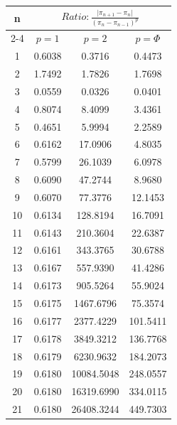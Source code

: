 \documentclass{article}
\providecommand{\abs}[1]{\lvert#1\rvert}
\begin{document}
\begin{tabular}{|c|c|c|c|}
\hline
\multirow{2}{*}{n} & \multicolumn{3}{|c|}{$Ratio:\displaystyle\frac{\abs{\pi_{n+1}-\pi_{n}}}{({\pi_{n}-\pi_{n-1}})^p}$} \\
\cline{2-4}
 & $p=1$ & $p=2$ & $p=\Phi$ \\
\hline
 1 & 0.6038 & 0.3716 & 0.4473 \\ 
  2 & 1.7492 & 1.7826 & 1.7698 \\ 
  3 & 0.0559 & 0.0326 & 0.0401 \\ 
  4 & 0.8074 & 8.4099 & 3.4361 \\ 
  5 & 0.4651 & 5.9994 & 2.2589 \\ 
  6 & 0.6162 & 17.0906 & 4.8035 \\ 
  7 & 0.5799 & 26.1039 & 6.0978 \\ 
  8 & 0.6090 & 47.2744 & 8.9680 \\ 
  9 & 0.6070 & 77.3776 & 12.1453 \\ 
 10 & 0.6134 & 128.8194 & 16.7091 \\ 
 11 & 0.6143 & 210.3604 & 22.6387 \\ 
 12 & 0.6161 & 343.3765 & 30.6788 \\ 
 13 & 0.6167 & 557.9390 & 41.4286 \\ 
 14 & 0.6173 & 905.5264 & 55.9024 \\ 
 15 & 0.6175 & 1467.6796 & 75.3574 \\ 
 16 & 0.6177 & 2377.4229 & 101.5411 \\ 
 17 & 0.6178 & 3849.3212 & 136.7768 \\ 
 18 & 0.6179 & 6230.9632 & 184.2073 \\ 
 19 & 0.6180 & 10084.5048 & 248.0557 \\ 
 20 & 0.6180 & 16319.6990 & 334.0115 \\ 
 21 & 0.6180 & 26408.3244 & 449.7303 \\ 
 \hline 
\end{tabular}
\end{document}
